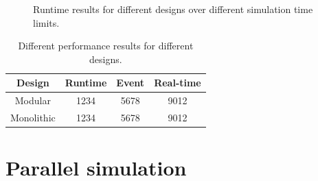 
\begin{figure}
    \centering
    \begin{tikzpicture}
%        
    \end{tikzpicture}    
    \caption{Runtime results for different designs over different simulation time limits.}
    \label{fig:results_runtime_sim_time}
\end{figure}




\begin{table}
    \centering
    \begin{tabular}{|c|c|c|c|}
        \hline \textbf{Design} & \textbf{Runtime} & \textbf{Event} & \textbf{Real-time} \\
        \hline 
        \hline Modular & 1234 & 5678 & 9012 \\ 
        \hline Monolithic & 1234 & 5678 & 9012  \\ 
        \hline 
    \end{tabular}
    \label{tab:measurements_design_seq}
    \caption{Different performance results for different designs.}
    
\end{table}

\section{Parallel simulation}
\label{sec:measurements_parallel}